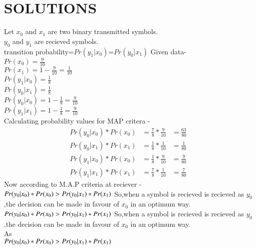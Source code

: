 \documentclass[journel,12pt,twocoloums]{IEEEtran}
\begin{document}
\section{SOLUTIONS}
Let $x_0$ and $x_1$ are two binary transmitted symbols.\\
$y_0$ and $y_1$ are recieved symbols.\\
transition probability=$Pr(y_1|x_0)$=$Pr(y_0|x_1)$
Given data-\\
$Pr(x_0)=\frac{9}{10}$\\
$Pr(x_1)=1-\frac{9}{10}=\frac{1}{10}$\\
$Pr(y_1|x_0)=\frac{1}{8}$\\
$Pr(y_0|x_1)=\frac{1}{8}$\\
$Pr(y_0|x_0)=1-\frac{1}{8}=\frac{9}{10}$\\
$Pr(y_1|x_1)=1-\frac{1}{8}=\frac{9}{10}$\\
Calculating probability values for MAP critera -
\begin{align}
 Pr(y_0|x_0)*Pr(x_0) &= \frac{7}{8} *\frac{9}{10}
                     &= \frac{63}{80}
\end{align}
\begin{align}
 Pr(y_0|x_1)*Pr(x_1) &= \frac{1}{8} *\frac{1}{10}
                     &= \frac{1}{80}
\end{align}
\begin{align}
 Pr(y_1|x_0)*Pr(x_0) &= \frac{1}{8} *\frac{9}{10}
                     &= \frac{9}{80}
\end{align}
\begin{align}
 Pr(y_1|x_1)*Pr(x_1) &= \frac{7}{8} *\frac{1}{10}
                     &= \frac{7}{80}
\end{align}
Now according to M.A.P criteria at reciever -\\
\begin{math}
Pr(y_0|x_0)*Pr(x_0)>Pr(y_0|x_1)*Pr(x_1)\\
\end{math}
So,when a symbol is recieved is recieved as $y_0$ ,the decision can be made in favour of $x_0$ in an optimum way.\\
\begin{math}
Pr(y_0|x_0)*Pr(x_0)>Pr(y_0|x_1)*Pr(x_1)\\
\end{math}
So,when a symbol is recieved is recieved as $y_0$ ,the decision can be made in favour of $x_0$ in an optimum way.\\
As\\
\begin{math}
Pr(y_0|x_0)*Pr(x_0)>Pr(y_0|x_1)*Pr(x_1)\\
\end{math}
\end{document}
